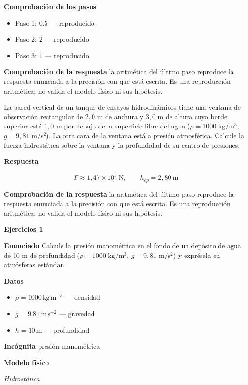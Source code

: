 \documentclass[10pt,openany]{book}
\begin{document}
\noindent\textbf{Comprobación de los pasos}
\begin{itemize}
\item Paso 1: $0.5$ — reproducido
\item Paso 2: $2$ — reproducido
\item Paso 3: $1$ — reproducido
\end{itemize}

\noindent\textbf{Comprobación de la respuesta} la aritmética del último paso reproduce la respuesta enunciada a la precisión con que está escrita. Es una reproducción aritmética; no valida el modelo físico ni sus hipótesis.

La pared vertical de un tanque de ensayos hidrodinámicos tiene una ventana de observación rectangular de \(2{,}0\) m de anchura y \(3{,}0\) m de altura cuyo borde superior está \(1{,}0\) m por debajo de la superficie libre del agua (\(\rho = 1000\) kg/m\(^3\), \(g = 9{,}81\) m/s\(^2\)). La otra cara de la ventana está a presión atmosférica. Calcule la fuerza hidrostática sobre la ventana y la profundidad de su centro de presiones.

\noindent\textbf{Respuesta}

\[
F \approx 1{,}47\times 10^{5}\ \mathrm{N},\qquad h_{cp} = 2{,}80\ \mathrm{m}
\]

\noindent\textbf{Comprobación de la respuesta} la aritmética del último paso reproduce la respuesta enunciada a la precisión con que está escrita. Es una reproducción aritmética; no valida el modelo físico ni sus hipótesis.

\noindent\textbf{Ejercicios 1}

\noindent\textbf{Enunciado}
Calcule la presión manométrica en el fondo de un depósito de agua de 10 m de profundidad (\(\rho = 1000\) kg/m\(^3\), \(g = 9{,}81\) m/s\(^2\)) y exprésela en atmósferas estándar.

\noindent\textbf{Datos}
\begin{itemize}
\item $\rho = 1000\,\mathrm{kg}\,\mathrm{m}^{-3}$ — densidad
\item $g = 9.81\,\mathrm{m}\,\mathrm{s}^{-2}$ — gravedad
\item $h = 10\,\mathrm{m}$ — profundidad
\end{itemize}

\noindent\textbf{Incógnita}
presión manométrica

\noindent\textbf{Modelo físico}

\noindent\textit{Hidrostática}
\end{document}
